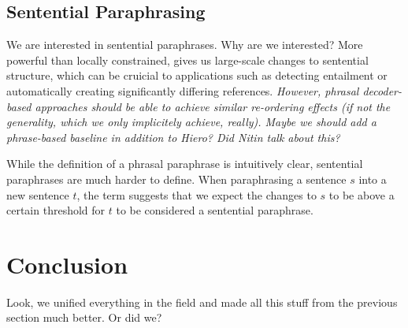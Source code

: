 \documentclass[11pt]{article}
\begin{document}
\subsection{Sentential Paraphrasing} \label{sentential_paraphrasing}

We are interested in sentential paraphrases. Why are we interested?
More powerful than locally constrained, gives us large-scale changes
to sentential structure, which can be cruicial to applications such as
detecting entailment or automatically creating significantly differing
references. \emph{However, phrasal decoder-based approaches should be
  able to achieve similar re-ordering effects (if not the generality,
  which we only implicitely achieve, really). Maybe we should add a
  phrase-based baseline in addition to Hiero? Did Nitin talk about
  this?}

While the definition of a phrasal paraphrase is intuitively clear,
sentential paraphrases are much harder to define. When paraphrasing a
sentence $s$ into a new sentence $t$, the term suggests that we expect
the changes to $s$ to be above a certain threshold for $t$ to be
considered a sentential paraphrase. 

\newpage

\section{Conclusion} \label{conclusion}

Look, we unified everything in the field and made all this stuff from
the previous section much better. Or did we?

\newpage




\nocite{*}
\end{document}
